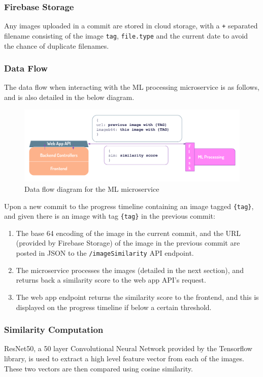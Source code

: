 \documentclass[12pt,a4paper]{article}
\begin{document}
\subsubsection{Firebase Storage} Any images uploaded in a commit are stored in cloud storage, with a \verb|+| separated filename consisting of the image \verb|tag|, \verb|file.type| and the current date to avoid the chance of duplicate filenames.
\subsubsection{Data Flow} The data flow when interacting with the ML processing microservice is as follows, and is also detailed in the below diagram.
\begin{figure}[H]
    \centering
    \includegraphics[scale=0.6]{ml.png}
    \caption{Data flow diagram for the ML microservice}
\end{figure}
Upon a new commit to the progress timeline containing an image tagged \verb|{tag}|, and given there is an image with tag \verb|{tag}| in the previous commit:
\begin{enumerate}
    \item The base 64 encoding of the image in the current commit, and the URL (provided by Firebase Storage) of the image in the previous commit are posted in JSON to the \verb|/imageSimilarity| API endpoint. 
    \item The microservice processes the images (detailed in the next section), and returns back a similarity score to the web app API's request.
    \item The web app endpoint returns the similarity score to the frontend, and this is displayed on the progress timeline if below a certain threshold.
\end{enumerate}
\subsubsection{Similarity Computation} ResNet50, a 50 layer Convolutional Neural Network provided by the Tensorflow library, is used to extract a high level feature vector from each of the images. These two vectors are then compared using cosine similarity.\\
\end{document}
